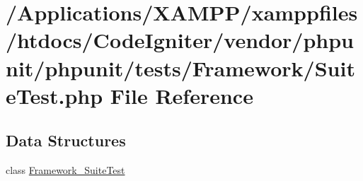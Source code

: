 \hypertarget{_suite_test_8php}{}\section{/\+Applications/\+X\+A\+M\+P\+P/xamppfiles/htdocs/\+Code\+Igniter/vendor/phpunit/phpunit/tests/\+Framework/\+Suite\+Test.php File Reference}
\label{_suite_test_8php}
\subsection*{Data Structures}
\begin{DoxyCompactItemize}
\item 
class \mbox{\hyperlink{class_framework___suite_test}{Framework\+\_\+\+Suite\+Test}}
\end{DoxyCompactItemize}
